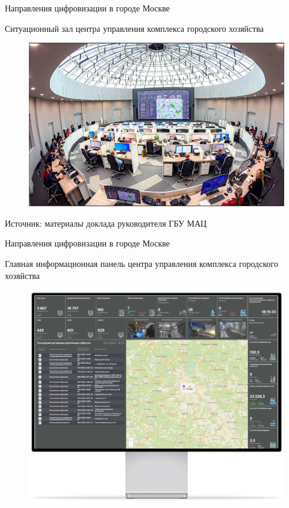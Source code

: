\documentclass[12pt, pdf, hyperref={unicode},handout]{beamer}
\begin{document}
\begin{frame}{\Large{Направления цифровизации в городе Москве}}
\begin{block}{Ситуационный зал центра управления комплекса городского хозяйства}

  \begin{figure}[htb] 
      \centering
      \includegraphics [scale=3.5]{ris7.png}
    \end{figure}

   Источник: материалы доклада руководителя ГБУ МАЦ
 
  
 \end{block}
\end{frame}


\begin{frame}{\Large{Направления цифровизации в городе Москве}}
\begin{block}{Главная информационная панель центра управления комплекса городского хозяйства}

  \begin{figure}[htb] 
      \centering
      \includegraphics [scale=1.5]{ris8.png}
    \end{figure}
 
  
 \end{block}
\end{frame}
\end{document}
